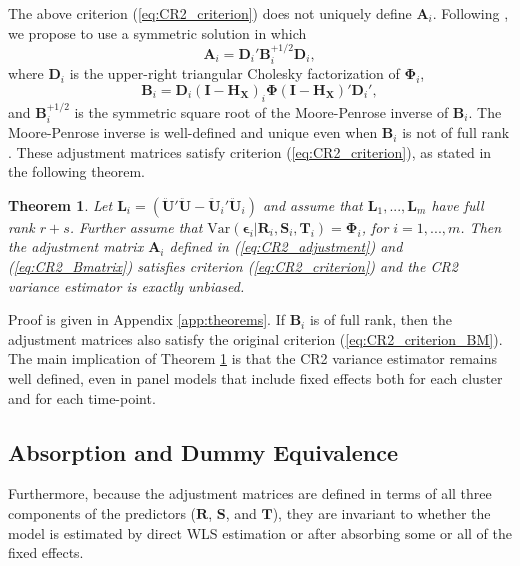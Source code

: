 \documentclass[12pt]{article}\usepackage[]{graphicx}\usepackage[]{color}
\newtheorem{thm}{Theorem}
\newcommand{\Var}{\text{Var}}
\newcommand{\bm}{\mathbf}
\newcommand{\bs}{\boldsymbol}
\begin{document}
The above criterion (\ref{eq:CR2_criterion}) does not uniquely define $\bm{A}_i$. Following \citet{McCaffrey2001generalizations}, we propose to use a symmetric solution in which
\begin{equation}
\label{eq:CR2_adjustment}
\bm{A}_i = \bm{D}_i' \bm{B}_i^{+1/2} \bm{D}_i,
\end{equation}
where $\bm{D}_i$ is the upper-right triangular Cholesky factorization of $\bs\Phi_i$, 
\begin{equation}
\label{eq:CR2_Bmatrix}
\bm{B}_i = \bm{D}_i\left(\bm{I} - \bm{H_X}\right)_i \bs\Phi \left(\bm{I} - \bm{H_X}\right)' \bm{D}_i',
\end{equation}
and $\bm{B}_i^{+1/2}$ is the symmetric square root of the Moore-Penrose inverse of $\bm{B}_i $. 
The Moore-Penrose inverse is well-defined and unique even when $\bm{B}_i$ is not of full rank \citep[][Thm. 9.18]{Banerjee2014linear}. These adjustment matrices satisfy criterion (\ref{eq:CR2_criterion}), as stated in the following theorem.

\begin{thm}
\label{thm:BRL_FE}
Let $\bm{L}_i = \left(\bm{\ddot{U}}'\bm{\ddot{U}} - \bm{\ddot{U}}_i'\bm{\ddot{U}}_i\right)$ and assume that $\bm{L}_1,...,\bm{L}_m$ have full rank $r + s$. Further assume that $\Var\left(\bs\epsilon_i\left|\bm{R}_i,\bm{S}_i,\bm{T}_i\right.\right) = \bs\Phi_i$, for $i = 1,...,m$. Then the adjustment matrix $\bm{A}_i$ defined in (\ref{eq:CR2_adjustment}) and (\ref{eq:CR2_Bmatrix}) satisfies criterion (\ref{eq:CR2_criterion}) and the CR2 variance estimator is exactly unbiased.
\end{thm}

Proof is given in Appendix \ref{app:theorems}. If $\bm{B}_i$ is of full rank, then the adjustment matrices also satisfy the original criterion (\ref{eq:CR2_criterion_BM}). The main implication of Theorem \ref{thm:BRL_FE} is that the CR2 variance estimator remains well defined, even in panel models that include fixed effects both for each cluster and for each time-point.

\subsection{Absorption and Dummy Equivalence}

Furthermore, because the adjustment matrices are defined in terms of all three components of the predictors ($\bm{R}$, $\bm{S}$, and $\bm{T}$), they are invariant to whether the model is estimated by direct WLS estimation or after absorbing some or all of the fixed effects. 
\end{document}
